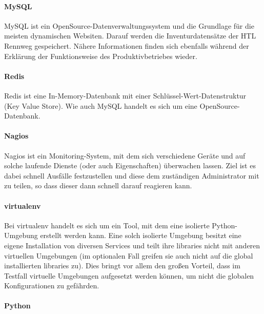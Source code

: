 \hypertarget{mysql}{%
\paragraph{MySQL}\label{mysql}}

MySQL ist ein OpenSource-Datenverwaltungssystem und die Grundlage für
die meisten dynamischen Websiten. Darauf werden die Inventurdatensätze
der HTL Rennweg gespeichert. Nähere Informationen finden sich ebenfalls
während der Erklärung der Funktionsweise des Produktivbetriebes
 wieder.

\hypertarget{redis}{%
\paragraph{Redis}\label{redis}}

Redis ist eine In-Memory-Datenbank mit einer
Schlüssel-Wert-Datenstruktur (Key Value Store). Wie auch MySQL handelt
es sich um eine OpenSource-Datenbank.

\hypertarget{nagios}{%
\paragraph{Nagios}\label{nagios}}

Nagios ist ein Monitoring-System, mit dem sich verschiedene Geräte und
auf solche laufende Dienste (oder auch Eigenschaften) überwachen lassen.
Ziel ist es dabei schnell Ausfälle festzustellen und diese dem
zuständigen Administrator mit zu teilen, so dass dieser dann schnell
darauf reagieren kann.

\hypertarget{virtualenv}{%
\paragraph{virtualenv}\label{virtualenv}}

Bei virtualenv handelt es sich um ein Tool, mit dem eine isolierte
Python-Umgebung erstellt werden kann. Eine solch isolierte Umgebung
besitzt eine eigene Installation von diversen Services und teilt ihre
libraries nicht mit anderen virtuellen Umgebungen (im optionalen Fall
greifen sie auch nicht auf die global installierten libraries zu). Dies
bringt vor allem den großen Vorteil, dass im Testfall virtuelle
Umgebungen aufgesetzt werden können, um nicht die globalen
Konfigurationen zu gefährden.

\hypertarget{python}{%
\paragraph{Python}\label{python}}

